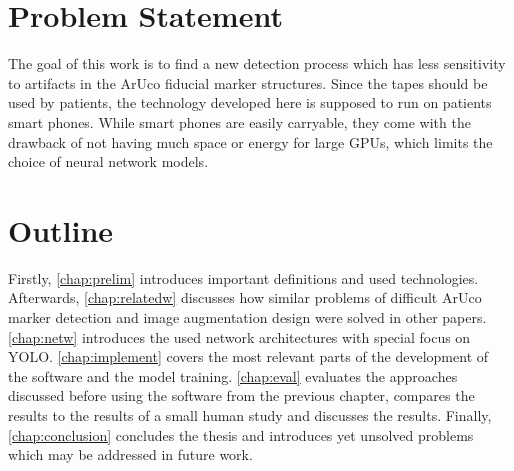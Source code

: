 \documentclass[10pt]{book}
\begin{document}

\section{Problem Statement}

The goal of this work is to find a new detection process which has less sensitivity to artifacts in the \ac{ArUco} fiducial marker structures. 
Since the tapes should be used by patients, the technology developed here is supposed to run on patients smart phones. While smart phones are easily carryable, they come with the drawback of not having much space or energy for large \acp{GPU}, which limits the choice of neural network models.

\section{Outline}

Firstly, \autoref{chap:prelim} introduces important definitions and used technologies. Afterwards, \autoref{chap:relatedw} discusses how similar problems of difficult \ac{ArUco} marker detection and image augmentation design were solved in other papers. \autoref{chap:netw} introduces the used network architectures with special focus on \ac{YOLO}. \autoref{chap:implement} covers the most relevant parts of the development of the software and the model training. \autoref{chap:eval} evaluates the approaches discussed before using the software from the previous chapter, compares the results to the results of a small human study and discusses the results. Finally, \autoref{chap:conclusion} concludes the thesis and introduces yet unsolved problems which may be addressed in future work.
\end{document}
